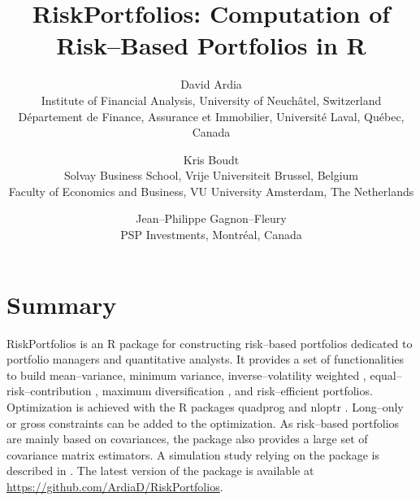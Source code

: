 \documentclass[11pt]{article}
\begin{document}
\title{RiskPortfolios: Computation of Risk--Based Portfolios in R}
\author{David Ardia\\
Institute of Financial Analysis, University of Neuch\^atel, Switzerland\\
D\'epartement de Finance, Assurance et Immobilier, Universit\'e Laval, Qu\'ebec, Canada
\and
Kris Boudt\\
Solvay Business School, Vrije Universiteit Brussel, Belgium\\
Faculty of Economics and Business, VU University Amsterdam, The Netherlands
\and
Jean--Philippe Gagnon--Fleury\\
PSP Investments, Montr\'eal, Canada
}
	
\maketitle

\section*{Summary}

RiskPortfolios is an R package \citep{R} for constructing risk--based portfolios dedicated to portfolio managers and quantitative analysts. 
It provides a set of 
functionalities to build mean--variance, minimum variance, inverse--volatility weighted \citep{LeoteEtAl2012}, 
equal--risk--contribution \citep{MaillardEtAl2010}, maximum diversification \citep{Choueifaty2008}, and 
risk--efficient \citep{AmencEtAl2011} portfolios. Optimization is achieved with the R packages quadprog \citep{quadprog} and nloptr \citep{nloptr}. 
Long--only or gross constraints can be added to the optimization. 
As risk--based portfolios are mainly based on covariances, the package also provides a large set of covariance matrix estimators. A simulation study relying on the package
is described in \citet{ArdiaEtAl2016}. The latest version of the package is 
available at \url{https://github.com/ArdiaD/RiskPortfolios}.



	
\end{document}

